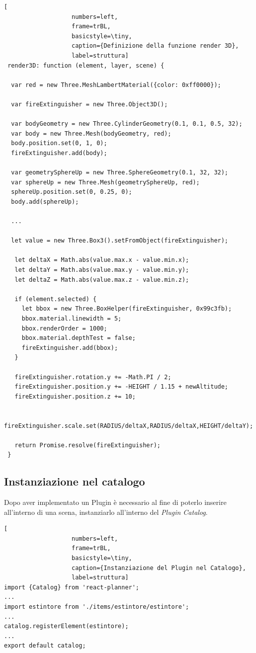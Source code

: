 \begin{lstlisting}[
                   numbers=left,
                   frame=trBL,
                   basicstyle=\tiny,
                   caption={Definizione della funzione render 3D},
                   label=struttura]
 render3D: function (element, layer, scene) {

  var red = new Three.MeshLambertMaterial({color: 0xff0000});

  var fireExtinguisher = new Three.Object3D();

  var bodyGeometry = new Three.CylinderGeometry(0.1, 0.1, 0.5, 32);
  var body = new Three.Mesh(bodyGeometry, red);
  body.position.set(0, 1, 0);
  fireExtinguisher.add(body);

  var geometrySphereUp = new Three.SphereGeometry(0.1, 32, 32);
  var sphereUp = new Three.Mesh(geometrySphereUp, red);
  sphereUp.position.set(0, 0.25, 0);
  body.add(sphereUp);

  ...

  let value = new Three.Box3().setFromObject(fireExtinguisher);

   let deltaX = Math.abs(value.max.x - value.min.x);
   let deltaY = Math.abs(value.max.y - value.min.y);
   let deltaZ = Math.abs(value.max.z - value.min.z);

   if (element.selected) {
     let bbox = new Three.BoxHelper(fireExtinguisher, 0x99c3fb);
     bbox.material.linewidth = 5;
     bbox.renderOrder = 1000;
     bbox.material.depthTest = false;
     fireExtinguisher.add(bbox);
   }

   fireExtinguisher.rotation.y += -Math.PI / 2;
   fireExtinguisher.position.y += -HEIGHT / 1.15 + newAltitude;
   fireExtinguisher.position.z += 10;

   fireExtinguisher.scale.set(RADIUS/deltaX,RADIUS/deltaX,HEIGHT/deltaY);

   return Promise.resolve(fireExtinguisher);
 }
\end{lstlisting}
\newpage

\subsection{Instanziazione nel catalogo}
Dopo aver implementato un Plugin è necessario al fine di poterlo inserire all'interno di una scena, instanziarlo
all'interno del \emph{Plugin Catalog}.\\
\begin{lstlisting}[
                   numbers=left,
                   frame=trBL,
                   basicstyle=\tiny,
                   caption={Instanziazione del Plugin nel Catalogo},
                   label=struttura]
import {Catalog} from 'react-planner';
...
import estintore from './items/estintore/estintore';
...
catalog.registerElement(estintore);
...
export default catalog;
\end{lstlisting}

